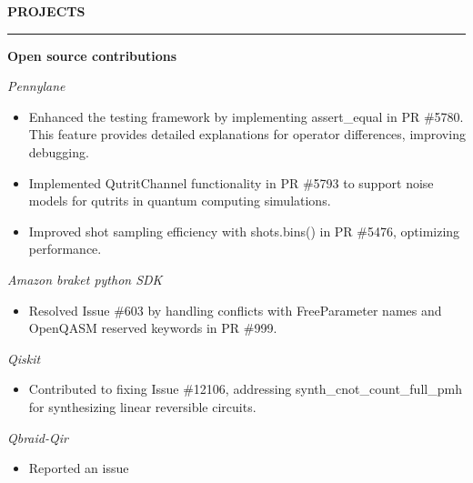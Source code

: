 \documentclass[a4paper,10pt]{article}
\newcommand{\cvHeaderOne}[1]{%
  \vspace*{1.5em}%
  {\noindent\large\textbf{\MakeUppercase{#1}}\par}%
  \noindent\rule{\linewidth}{0.4pt}%
  \vspace*{0.5em}%
}
\newcommand{\cvHeaderTwo}[2]{%
  \vspace{0.8em}%
  \noindent\textbf{\normalsize #1} \hfill \textit{#2}\par%
}
\newcommand{\cvHeaderThree}[1]{%
  \noindent\textit{#1}%
}
\newenvironment{cvItemList}{%
  \begin{itemize}%
    \setlength{\itemsep}{0.1em}%
    \setlength{\topsep}{0em}%
    \setlength{\partopsep}{0em}%
    \setlength{\parsep}{0em}%
    \setlength{\parskip}{0em}%
}{%
  \end{itemize}%
}
\begin{document}
\cvHeaderOne{Projects}

\cvHeaderTwo{Open source contributions}{}

\cvHeaderThree{Pennylane}
\begin{cvItemList}
\item Enhanced the testing framework by implementing assert\_equal in PR \#5780. This feature provides detailed explanations for operator differences, improving debugging.
\item Implemented QutritChannel functionality in PR \#5793 to support noise models for qutrits in quantum computing simulations.
\item Improved shot sampling efficiency with shots.bins() in PR \#5476, optimizing performance.
\end{cvItemList}

\cvHeaderThree{Amazon braket python SDK}
\begin{cvItemList}
\item Resolved Issue \#603 by handling conflicts with FreeParameter names and OpenQASM reserved keywords in PR \#999. 
\end{cvItemList}

\cvHeaderThree{Qiskit}
\begin{cvItemList}
\item Contributed to fixing Issue \#12106, addressing synth\_cnot\_count\_full\_pmh for synthesizing linear reversible circuits.
\end{cvItemList}

\cvHeaderThree{Qbraid-Qir}
\begin{cvItemList}
\item Reported an issue 
\end{cvItemList}
\end{document}
